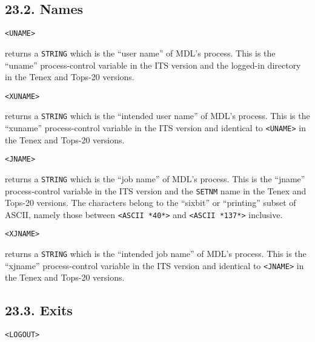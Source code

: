 \documentclass[a4paper,]{article}
\begin{document}
\subsection{23.2. Names}\label{names}

\begin{verbatim}
<UNAME>
\end{verbatim}

 returns a \texttt{STRING} which is the ``user name'' of MDL's process. This is the ``uname''
process-control variable in the ITS version and the logged-in directory in the Tenex and Tops-20
versions.

\begin{verbatim}
<XUNAME>
\end{verbatim}

 returns a \texttt{STRING} which is the ``intended user name'' of MDL's process. This is the
``xuname'' process-control variable in the ITS version and identical to \texttt{\textless{}UNAME\textgreater{}} in the
Tenex and Tops-20 versions.

\begin{verbatim}
<JNAME>
\end{verbatim}

 returns a \texttt{STRING} which is the ``job name'' of MDL's process. This is the ``jname''
process-control variable in the ITS version and the \texttt{SETNM} name in the Tenex and Tops-20 versions. The characters
belong to the ``sixbit'' or ``printing'' subset of ASCII, namely those between
\texttt{\textless{}ASCII\ *40*\textgreater{}} and \texttt{\textless{}ASCII\ *137*\textgreater{}} inclusive.

\begin{verbatim}
<XJNAME>
\end{verbatim}

 returns a \texttt{STRING} which is the ``intended job name'' of MDL's process. This is the
``xjname'' process-control variable in the ITS version and identical to \texttt{\textless{}JNAME\textgreater{}} in the
Tenex and Tops-20 versions.

\subsection{23.3. Exits}\label{exits}

\begin{verbatim}
<LOGOUT>
\end{verbatim}
\end{document}
